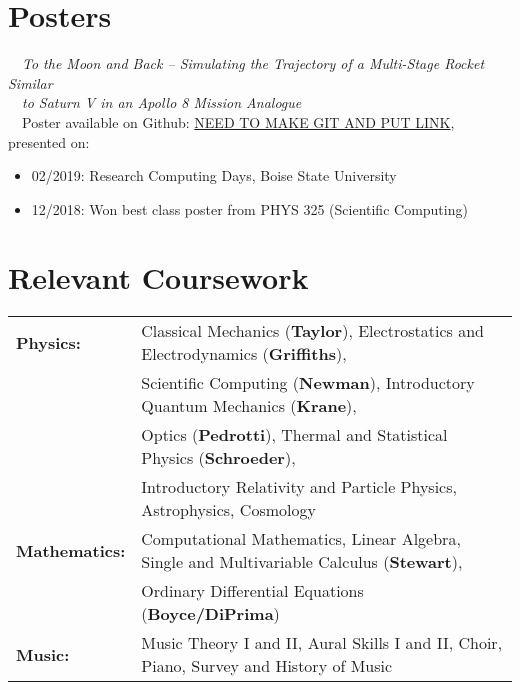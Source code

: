 \documentclass[11pt]{article}
\begin{document}
\section{Posters}
\-\ \-\ \textit{To the Moon and Back -- Simulating the Trajectory of a Multi-Stage Rocket Similar} \\
\-\ \-\ \textit{to Saturn V in an Apollo 8 Mission Analogue}\vspace{1mm}\\
\-\ \-\ Poster available on Github: \url{NEED TO MAKE GIT AND PUT LINK}, presented on:
\-\ \-\ \begin{itemize}[noitemsep]
              \item 02/2019: Research Computing Days, Boise State University
              \item 12/2018: Won best class poster from PHYS 325 (Scientific Computing)
        \end{itemize}

\section{Relevant Coursework}
\begin{tabular}{ll}
\textbf{Physics:} &   Classical Mechanics (\textbf{Taylor}), Electrostatics and Electrodynamics (\textbf{Griffiths}), \\
                  &   Scientific Computing (\textbf{Newman}), Introductory Quantum Mechanics (\textbf{Krane}), \\
                  &   Optics (\textbf{Pedrotti}), Thermal and Statistical Physics (\textbf{Schroeder}),\\
                  &   Introductory Relativity and Particle Physics, Astrophysics, Cosmology \vspace{1mm} \\
\textbf{Mathematics:} &   Computational Mathematics, Linear Algebra, Single and Multivariable Calculus (\textbf{Stewart}),\\
                      &   Ordinary Differential Equations (\textbf{Boyce/DiPrima}) \vspace{1mm} \\
\textbf{Music:}   &   Music Theory I and II, Aural Skills I and II, Choir, Piano, Survey and History of Music \\
\end{tabular}
\end{document}
